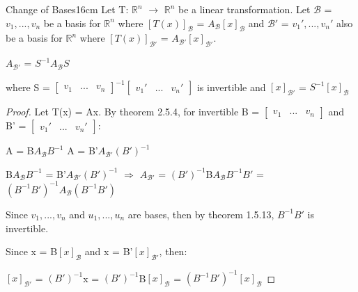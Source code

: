     \begin{corollary}{Change of Bases}{16cm}
        Let T: $\mathbb{R}^n$ $\rightarrow$ $\mathbb{R}^n$
        be a linear transformation.
        Let $\mathcal{B}$ = $v_1,...,v_n$ be a basis for $\mathbb{R}^n$
        where $[T(x)]_{\mathcal{B}}$ = $A_{\mathcal{B}}[x]_{\mathcal{B}}$
        and $\mathcal{B}'$ = $v_1',...,v_n'$ also be a basis for $\mathbb{R}^n$
        where $[T(x)]_{\mathcal{B}'}$ = $A_{\mathcal{B}'}[x]_{\mathcal{B}'}$.

        \hspace{0.5cm}
        $A_{\mathcal{B}'}$
        = $S^{-1} A_{\mathcal{B}}S$

        where S =
        $\begin{bmatrix}
            v_1 & ... & v_n
        \end{bmatrix}^{-1}
        \begin{bmatrix}
            v_1' & ... & v_n'
        \end{bmatrix}$
        is invertible
        and $[x]_{\mathcal{B}'}$ = $S^{-1}[x]_{\mathcal{B}}$ 
    \end{corollary}

    \begin{proof}
        Let T(x) = Ax. By {\color{red} theorem 2.5.4}, for
        invertible B =
        $\begin{bmatrix}
            v_1 & ... & v_n
        \end{bmatrix}$ and B' =
        $\begin{bmatrix}
            v_1' & ... & v_n'
        \end{bmatrix}$:

        \hspace{0.5cm}
        A = B$A_{\mathcal{B}}B^{-1}$
        \hspace{1cm}
        A = B'$A_{\mathcal{B}'}(B')^{-1}$

        \hspace{0.5cm}
        B$A_{\mathcal{B}}B^{-1}$
        = B'$A_{\mathcal{B}'}(B')^{-1}$
        \hspace{0.5cm}
        $\Rightarrow$
        \hspace{0.5cm}
        $A_{\mathcal{B}'}$
        = $(B')^{-1}$B$A_{\mathcal{B}}B^{-1}B'$
        = $(B^{-1}B')^{-1} A_{\mathcal{B}} (B^{-1}B')$

        Since $v_1,...,v_n$ and $u_1,...,u_n$ are bases, then
        by {\color{red} theorem 1.5.13}, $B^{-1}B'$ is invertible.

        Since x = B$[x]_{\mathcal{B}}$ and x = B'$[x]_{\mathcal{B}'}$, then:
        
        \hspace{0.5cm}
        $[x]_{\mathcal{B}'}$
        = $(B')^{-1}$x
        = $(B')^{-1}$B$[x]_{\mathcal{B}}$
        = $(B^{-1}B')^{-1} [x]_{\mathcal{B}}$
    \end{proof}


